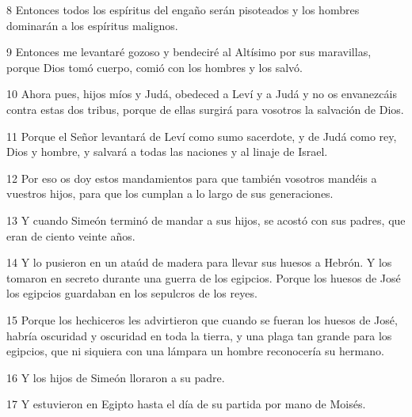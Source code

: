 \par 8 Entonces todos los espíritus del engaño serán pisoteados y los hombres dominarán a los espíritus malignos.

\par 9 Entonces me levantaré gozoso y bendeciré al Altísimo por sus maravillas, porque Dios tomó cuerpo, comió con los hombres y los salvó.

\par 10 Ahora pues, hijos míos y Judá, obedeced a Leví y a Judá y no os envanezcáis contra estas dos tribus, porque de ellas surgirá para vosotros la salvación de Dios.

\par 11 Porque el Señor levantará de Leví como sumo sacerdote, y de Judá como rey, Dios y hombre, y salvará a todas las naciones y al linaje de Israel.

\par 12 Por eso os doy estos mandamientos para que también vosotros mandéis a vuestros hijos, para que los cumplan a lo largo de sus generaciones.

\par 13 Y cuando Simeón terminó de mandar a sus hijos, se acostó con sus padres, que eran de ciento veinte años.

\par 14 Y lo pusieron en un ataúd de madera para llevar sus huesos a Hebrón. Y los tomaron en secreto durante una guerra de los egipcios. Porque los huesos de José los egipcios guardaban en los sepulcros de los reyes.

\par 15 Porque los hechiceros les advirtieron que cuando se fueran los huesos de José, habría oscuridad y oscuridad en toda la tierra, y una plaga tan grande para los egipcios, que ni siquiera con una lámpara un hombre reconocería su hermano.

\par 16 Y los hijos de Simeón lloraron a su padre.

\par 17 Y estuvieron en Egipto hasta el día de su partida por mano de Moisés.


